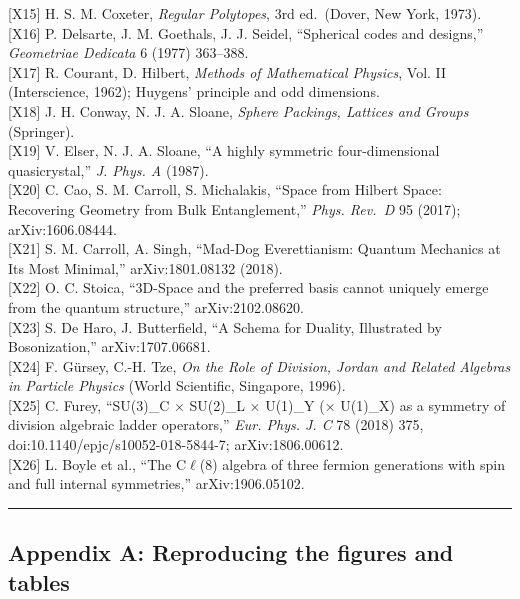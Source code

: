 \documentclass[
  a4paper,
]{article}
\begin{document}
{[}X15{]} H. S. M. Coxeter, \emph{Regular Polytopes}, 3rd ed.~(Dover,
New York, 1973).\\
{[}X16{]} P. Delsarte, J. M. Goethals, J. J. Seidel, ``Spherical codes
and designs,'' \emph{Geometriae Dedicata} 6 (1977) 363--388.\\
{[}X17{]} R. Courant, D. Hilbert, \emph{Methods of Mathematical
Physics}, Vol. II (Interscience, 1962); Huygens' principle and odd
dimensions.\\
{[}X18{]} J. H. Conway, N. J. A. Sloane, \emph{Sphere Packings, Lattices
and Groups} (Springer).\\
{[}X19{]} V. Elser, N. J. A. Sloane, ``A highly symmetric
four-dimensional quasicrystal,'' \emph{J. Phys. A} (1987).\\
{[}X20{]} C. Cao, S. M. Carroll, S. Michalakis, ``Space from Hilbert
Space: Recovering Geometry from Bulk Entanglement,'' \emph{Phys. Rev.~D}
95 (2017); arXiv:1606.08444.\\
{[}X21{]} S. M. Carroll, A. Singh, ``Mad-Dog Everettianism: Quantum
Mechanics at Its Most Minimal,'' arXiv:1801.08132 (2018).\\
{[}X22{]} O. C. Stoica, ``3D-Space and the preferred basis cannot
uniquely emerge from the quantum structure,'' arXiv:2102.08620.\\
{[}X23{]} S. De Haro, J. Butterfield, ``A Schema for Duality,
Illustrated by Bosonization,'' arXiv:1707.06681.\\
{[}X24{]} F. Gürsey, C.-H. Tze, \emph{On the Role of Division, Jordan
and Related Algebras in Particle Physics} (World Scientific, Singapore,
1996).\\
{[}X25{]} C. Furey, ``SU(3)\_C × SU(2)\_L × U(1)\_Y (× U(1)\_X) as a
symmetry of division algebraic ladder operators,'' \emph{Eur. Phys. J.
C} 78 (2018) 375, doi:10.1140/epjc/s10052-018-5844-7;
arXiv:1806.00612.\\
{[}X26{]} L. Boyle et al., ``The C\(\ell\)(8) algebra of three fermion
generations with spin and full internal symmetries,'' arXiv:1906.05102.

\begin{center}\rule{0.5\linewidth}{0.5pt}\end{center}

\subsection{Appendix A: Reproducing the figures and
tables}\label{appendix-a-reproducing-the-figures-and-tables}
\end{document}
